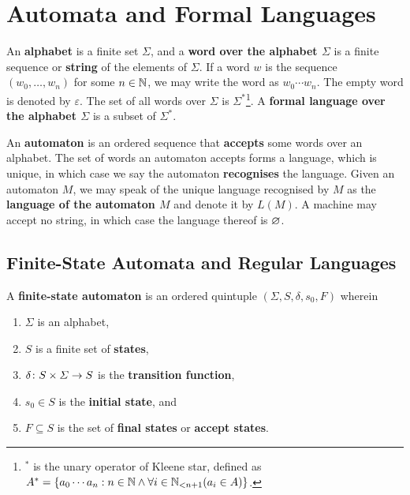 



\section{Automata and Formal Languages}

An {\bf alphabet} is a finite set \(\varSigma\), and a {\bf word over the
alphabet \(\varSigma\)} is a finite sequence or {\bf string} of the elements of
\(\varSigma\). If a word \(w\) is the sequence \((w_0, \ldots, w_n)\) for some
\(n \in \setnat\), we may write the word as \(w_0 \cdots w_n\). The empty word
is denoted by \(\varepsilon\). The set of all words over \(\varSigma\) is
\(\varSigma^*\)\footnote{\(^*\) is the unary operator of Kleene star, defined as
\(A^* = \set{a_0 \cdots a_n : n \in \setnat \land \forall i \in \Nln[n + 1] (a_i
\in A)}\).}. A {\bf formal language over the alphabet \(\varSigma\)} is a subset
of \(\varSigma^*\).

An {\bf automaton} is an ordered sequence that {\bf accepts} some words over an
alphabet. The set of words an automaton accepts forms a language, which is
unique, in which case we say the automaton {\bf recognises} the language. Given
an automaton \(M\), we may speak of the unique language recognised by \(M\) as
the {\bf language of the automaton \(M\)} and denote it by \(L(M)\). A machine
may accept no string, in which case the language thereof is \(\nset\).

\subsection{Finite-State Automata and Regular Languages}

\Bdf
    A {\bf finite-state automaton} is an ordered quintuple \((\varSigma, S,
    \delta, s_0, F)\) wherein
    \begin{enumerate}
        \item \(\varSigma\) is an alphabet,
        \item \(S\) is a finite set of {\bf states},
        \item \(\map{\delta}{S \times \varSigma}{S}\) is the {\bf transition
        function},
        \item \(s_0 \in S\) is the {\bf initial state}, and
        \item \(F \subseteq S\) is the set of {\bf final states} or {\bf accept
        states}.
    \end{enumerate}
\Edf

